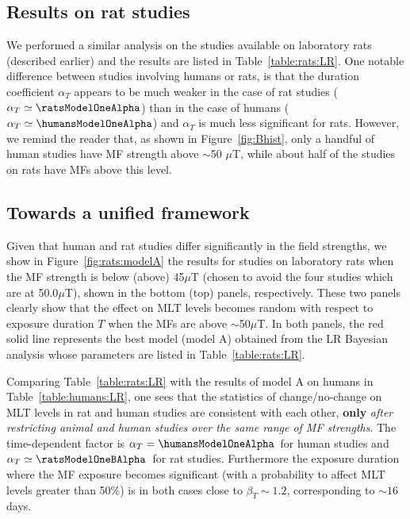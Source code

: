 \documentclass[letter]{article}
\begin{document}
\subsection*{Results on rat studies}
\label{section:results:rats}

We performed a similar analysis on the  studies available on laboratory rats (described earlier) and the results are listed  in  Table~\ref{table:rats:LR}. One notable difference  between studies involving humans or rats, is that the duration coefficient $\alpha_T$
 appears to be much weaker in the case of rat studies ($\alpha_T\simeq \ratsModelOneAlpha$) than in the case of humans ($\alpha_T\simeq \humansModelOneAlpha$) and  $\alpha_T$ is much less significant  for rats.
However, we remind the reader that, as shown in Figure~\ref{fig:Bhist}, only a handful of human studies  have MF strength above $
\sim$50 $\mu$T, while about half of the studies on rats have MFs above this level.


\subsection*{Towards a unified framework} 
\label{section:results:bimodal}

Given that human and rat studies differ significantly in the field strengths,  we show  in Figure~\ref{fig:rats:modelA}  the results for studies on laboratory rats when the MF strength is below (above)  45$\mu$T (chosen to avoid the four studies which are at 50.0$\mu$T), shown   in the bottom (top) panels, respectively. 
These two panels clearly show that the effect on MLT levels becomes  random with respect to exposure duration $T$ when the MFs are above $\sim$50$\mu$T.
In both panels, the red solid line represents the best  model (model A) obtained from the LR Bayesian analysis whose parameters are listed in Table~\ref{table:rats:LR}.


Comparing Table~\ref{table:rats:LR} with the results of model A on humans in Table~\ref{table:humans:LR},
one sees that  the statistics of change/no-change on MLT levels in
 rat and human studies are consistent with each other,  {\bf only} {\it after restricting animal and human studies over the same range of MF strengths}.
The time-dependent factor  is $\alpha_T=\humansModelOneAlpha$\humansModelOneAlphaErr\ for human studies and $\alpha_T\simeq\ratsModelOneBAlpha$\ratsModelOneBAlphaErr\ for rat studies. 
 Furthermore the exposure duration where the MF exposure  becomes significant (with a probability to affect MLT levels greater than 50\%) is in both cases close to $\beta_T\sim1.2$, corresponding to  $\sim16$ days.
\end{document}
